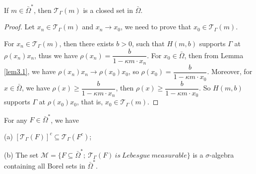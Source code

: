 \documentclass[a4paper,12pt,]{article}
\newtheorem{lemma}{\hskip\parindent\bf Lemma}[section]%
\numberwithin{equation}{section}
\numberwithin{equation}{section} \allowdisplaybreaks
\begin{document}
\begin{lemma}
  If $m \in \bar{\Omega}^{\ast}$, then $\mathcal{T}_{\Gamma}(m)$ is a closed set in $\bar{\Omega}$.
  \label{lem3.3}
\end{lemma}

\begin{proof}
  Let $x_{n} \in \mathcal{T}_{\Gamma}(m)$ and $x_{n} \rightarrow x_{0}$, we need to prove that $x_{0} \in \mathcal{T}_{\Gamma}(m)$.

  For $x_{n} \in \mathcal{T}_{\Gamma}(m)$, then there exists $b>0$, such that $H(m,b)$ supports $\Gamma$ at $\rho(x_{n})x_{n}$, thus we have $\rho(x_{n}) = \dfrac{b}{1 - \kappa m \cdot x_{n}}$. For $x_{0} \in \bar{\Omega}$, then from Lemma \ref{lem3.1}, we have $\rho(x_{n})x_{n} \rightarrow \rho(x_{0})x_{0}$, so $\rho(x_{0}) = \dfrac{b}{1 - \kappa m \cdot x_{0}}$. Moreover, for $x \in \bar{\Omega}$, we have $\rho(x) \geq \dfrac{b}{1 - \kappa m \cdot x_{n}}$, then $\rho(x) \geq \dfrac{b}{1 - \kappa m \cdot x_{0}}$. So $H(m,b)$ supports $\Gamma$ at $\rho(x_{0})x_{0}$, that is, $x_{0} \in \mathcal{T}_{\Gamma}(m)$.
\end{proof}

\begin{lemma}
  For any $F \in \bar{\Omega}^{\ast}$, we have
  
   (a) $[\mathcal{T}_{\Gamma}(F)]^{c} \subseteq \mathcal{T}_{\Gamma}(F^{c})$;
  
   (b) The set $\mathcal{M} = \{F \subseteq \bar{\Omega}^{\ast};~\mathcal{T}_{\Gamma}(F)~is~Lebesgue~measurable\}$ is a $\sigma$-algebra containing all Borel sets in $\bar{\Omega}^{\ast}$.
  \label{lem3.4}
\end{lemma}
\end{document}
